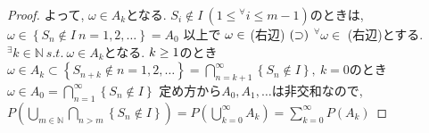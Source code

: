 \documentclass{jsarticle}
\begin{document}
\begin{proof}
よって, $\omega \in A_{k}$となる. $S_{i} \notin I \ (1 \le {}^\forall i \le m-1)$のときは, $\omega \in \left\{ S_{n} \notin I \ n=1,2,\dots \right\} = A_{0}$ 以上で $\\ \displaystyle \omega \in$ (右辺)
%
$\\ (\supset)$ $ {}^\forall \omega \in$ (右辺)とする. ${}^\exists k \in \mathbb{N} \ s.t. \ \omega \in A_{k}$となる.
$\\ k \ge 1$のとき $\displaystyle \omega \in A_{k} \subset \left\{ S_{n+k} \notin n=1,2,\dots \right\} = \bigcap_{n=k+1}^{\infty} \left\{ S_{n} \notin I \right\} ,\ k=0$のとき $\displaystyle \omega \in A_{0} = \bigcap_{n=1}^{\infty} \left\{ S_{n}\notin I \right\}$
定め方から$A_{0}, A_{1}, \dots$は非交和なので, $\displaystyle P(\bigcup_{m \in \mathbb{N}} \bigcap_{n>m} \left\{ S_{n} \notin I \right\} ) = P(\bigcup_{k=0}^{\infty} A_{k}) = \sum_{k=0}^{\infty} P(A_{k})$
\end{proof}
\end{document}
